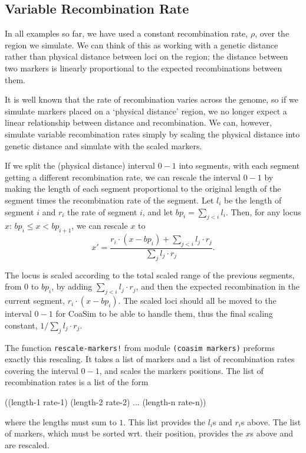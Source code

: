\documentclass{manual}
\begin{document}
\subsection{Variable Recombination Rate}
\label{sec:vari-recomb-rate}

In all examples so far, we have used a constant recombination rate,
$\rho$, over the region we simulate.  We can think of this as working
with a genetic distance rather than physical distance between loci on
the region; the distance between two markers is linearly proportional
to the expected recombinations between them.

It is well known that the rate of recombination varies across the
genome, so if we simulate markers placed on a `physical distance'
region, we no longer expect a linear relationship between distance and
recombination.  We can, however, simulate variable recombination rates
simply by scaling the physical distance into genetic distance and
simulate with the scaled markers.

If we split the (physical distance) interval $0-1$ into segments, with
each segment getting a different recombination rate, we can rescale
the interval $0-1$ by making the length of each segment proportional
to the original length of the segment times the recombination rate of
the segment.  Let $l_i$ be the length of segment $i$ and $r_i$ the
rate of segment $i$, and let $bp_i=\sum_{j<i}l_i$.  Then,
for any locus $x$: $bp_i \leq x < bp_{i+1}$, we can rescale $x$ to
\[x' = \frac{r_i\cdot{}(x-bp_i) + \sum_{j<i}l_j\cdot{}r_j}
            {\sum_{j}l_j\cdot{}r_j}.
\]

The locus is scaled according to the total scaled range of the
previous segments, from $0$ to $bp_i$, by adding
$\sum_{j<i}l_j\cdot{}r_j$, and then the expected recombination in the
current segment, $r_i\cdot(x-bp_i)$.  The scaled loci should all be
moved to the interval $0-1$ for CoaSim to be able to handle them, thus
the final scaling constant, $1/\sum_{j}l_j\cdot{}r_j$.


The function \texttt{rescale-markers!} from module \texttt{(coasim
  markers)} preforms exactly this rescaling.  It takes a list of
markers and a list of recombination rates covering the interval $0-1$,
and scales the markers positions.  The list of recombination rates is
a list of the form 
\begin{code}
{((length-1 rate-1) (length-2 rate-2) ... (length-n rate-n))}
\end{code}
where the lengths must sum to $1$.  This list
provides the $l_i$s and $r_i$s above.  The list of markers, which must
be sorted wrt. their position, provides the $x$s above and are
rescaled.
\end{document}
